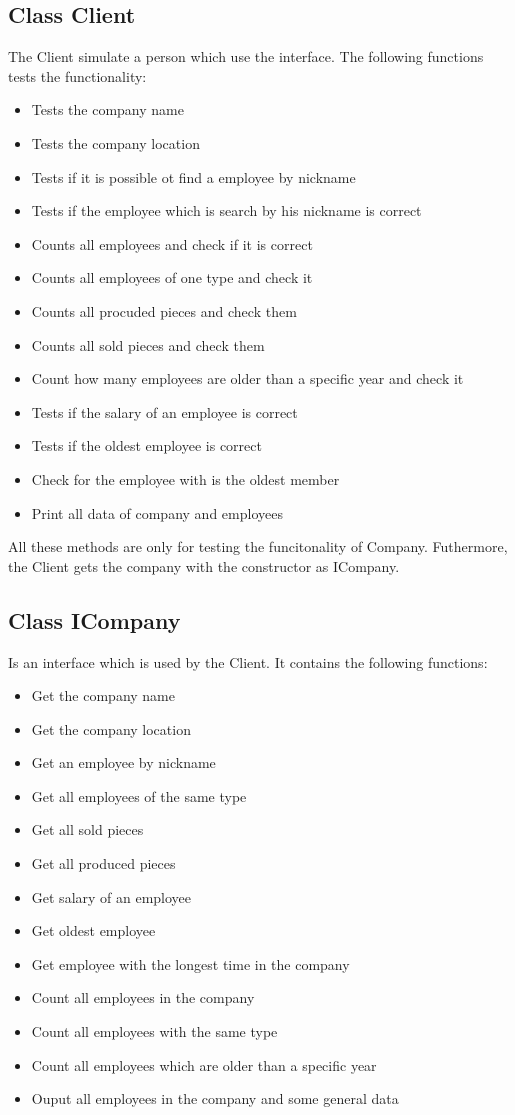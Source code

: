 \subsection{Class Client}
The Client simulate a person which use the interface.
The following functions tests the functionality:
\begin{itemize}
	\item Tests the company name
	\item Tests the company location
	\item Tests if it is possible ot find a employee by nickname
	\item Tests if the employee which is search by his nickname is correct
	\item Counts all employees and check if it is correct
	\item Counts all employees of one type and check it
	\item Counts all procuded pieces and check them
	\item Counts all sold pieces and check them
	\item Count how many employees are older than a specific year and check it
	\item Tests if the salary of an employee is correct
	\item Tests if the oldest employee is correct
	\item Check for the employee with is the oldest member
	\item Print all data of company and employees
\end{itemize}

All these methods are only for testing the funcitonality of Company. Futhermore, the Client gets the company with the constructor as ICompany.

\subsection{Class ICompany}
Is an interface which is used by the Client.
It contains the following functions:
\begin{itemize}
	\item Get the company name
	\item Get the company location
	\item Get an employee by nickname
	\item Get all employees of the same type
	\item Get all sold pieces
	\item Get all produced pieces
	\item Get salary of an employee
	\item Get oldest employee
	\item Get employee with the longest time in the company
	\item Count all employees in the company
	\item Count all employees with the same type
	\item Count all employees which are older than a specific year
	\item Ouput all employees in the company and some general data
\end{itemize}

